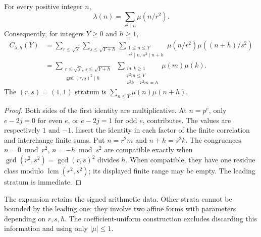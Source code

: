 
\begin{lemma}
\label{lem:square-divisor-correlation-retained}
For every positive integer \(n\),
\[
 \lambda(n)=\sum_{r^2\mid n}\mu(n/r^2).
\]
Consequently, for integers \(Y\ge0\) and \(h\ge1\),
\begin{align*}
 C_{\lambda,h}(Y)
 &=\sum_{r\le\sqrt Y}\sum_{s\le\sqrt{Y+h}}
   \sum_{\substack{1\le n\le Y\\r^2\mid n,\ s^2\mid n+h}}
       \mu(n/r^2)\mu((n+h)/s^2)\\
 &=\sum_{\substack{r\le\sqrt Y,\ s\le\sqrt{Y+h}\\
                   \gcd(r,s)^2\mid h}}
   \ \sum_{\substack{m,k\ge1\\r^2m\le Y\\s^2k-r^2m=h}}
       \mu(m)\mu(k).
\end{align*}
The \((r,s)=(1,1)\) stratum is
\(\sum_{n\le Y}\mu(n)\mu(n+h)\).
\end{lemma}
\begin{proof}
Both sides of the first identity are multiplicative. At \(n=p^e\),
only \(e-2j=0\) for even \(e\), or \(e-2j=1\) for odd \(e\),
contributes. The values are respectively \(1\) and \(-1\).
Insert the identity in each factor of the finite correlation and
interchange finite sums. Put \(n=r^2m\) and \(n+h=s^2k\).
The congruences \(n=0\bmod r^2\), \(n=-h\bmod s^2\) are compatible
exactly when \(\gcd(r^2,s^2)=\gcd(r,s)^2\) divides \(h\).
When compatible, they have one residue class modulo
\(\operatorname{lcm}(r^2,s^2)\); its displayed finite range may be empty.
The leading stratum is immediate.
\end{proof}

The expansion retains the signed arithmetic data. Other strata cannot
be bounded by the leading one: they involve two affine forms with
parameters depending on \(r,s,h\). The coefficient-uniform construction
excludes discarding this information and using only \(|\mu|\le1\).


